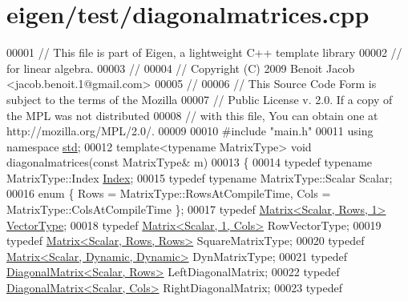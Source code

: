 \hypertarget{eigen_2test_2diagonalmatrices_8cpp_source}{}\section{eigen/test/diagonalmatrices.cpp}
\label{eigen_2test_2diagonalmatrices_8cpp_source}

\begin{DoxyCode}
00001 \textcolor{comment}{// This file is part of Eigen, a lightweight C++ template library}
00002 \textcolor{comment}{// for linear algebra.}
00003 \textcolor{comment}{//}
00004 \textcolor{comment}{// Copyright (C) 2009 Benoit Jacob <jacob.benoit.1@gmail.com>}
00005 \textcolor{comment}{//}
00006 \textcolor{comment}{// This Source Code Form is subject to the terms of the Mozilla}
00007 \textcolor{comment}{// Public License v. 2.0. If a copy of the MPL was not distributed}
00008 \textcolor{comment}{// with this file, You can obtain one at http://mozilla.org/MPL/2.0/.}
00009 
00010 \textcolor{preprocessor}{#include "main.h"}
00011 \textcolor{keyword}{using namespace }\hyperlink{namespacestd}{std};
00012 \textcolor{keyword}{template}<\textcolor{keyword}{typename} MatrixType> \textcolor{keywordtype}{void} diagonalmatrices(\textcolor{keyword}{const} MatrixType& m)
00013 \{
00014   \textcolor{keyword}{typedef} \textcolor{keyword}{typename} MatrixType::Index \hyperlink{namespace_eigen_a62e77e0933482dafde8fe197d9a2cfde}{Index};
00015   \textcolor{keyword}{typedef} \textcolor{keyword}{typename} MatrixType::Scalar Scalar;
00016   \textcolor{keyword}{enum} \{ Rows = MatrixType::RowsAtCompileTime, Cols = MatrixType::ColsAtCompileTime \};
00017   \textcolor{keyword}{typedef} \hyperlink{group___core___module_class_eigen_1_1_matrix}{Matrix<Scalar, Rows, 1>} \hyperlink{struct_vector_type}{VectorType};
00018   \textcolor{keyword}{typedef} \hyperlink{group___core___module_class_eigen_1_1_matrix}{Matrix<Scalar, 1, Cols>} RowVectorType;
00019   \textcolor{keyword}{typedef} \hyperlink{group___core___module_class_eigen_1_1_matrix}{Matrix<Scalar, Rows, Rows>} SquareMatrixType;
00020   \textcolor{keyword}{typedef} \hyperlink{group___core___module}{Matrix<Scalar, Dynamic, Dynamic>} DynMatrixType;
00021   \textcolor{keyword}{typedef} \hyperlink{group___core___module_class_eigen_1_1_diagonal_matrix}{DiagonalMatrix<Scalar, Rows>} LeftDiagonalMatrix;
00022   \textcolor{keyword}{typedef} \hyperlink{group___core___module_class_eigen_1_1_diagonal_matrix}{DiagonalMatrix<Scalar, Cols>} RightDiagonalMatrix;
00023   \textcolor{keyword}{typedef} 

\end{DoxyCode}
